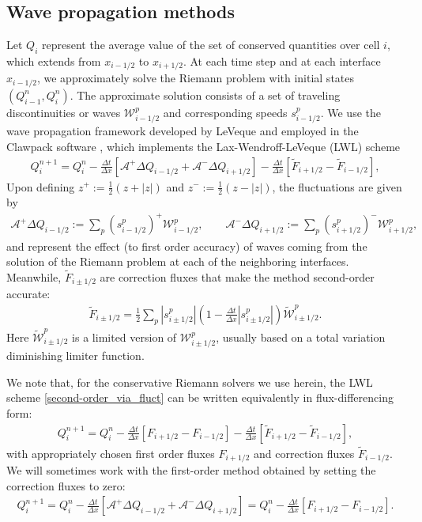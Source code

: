 \documentclass[preprint, 11pt]{article}
\newcommand{\W}{{\mathcal W}}
\newcommand{\A}{{\mathcal A}}
\newcommand{\apdq}{\A^+ \!\!{\Delta} Q}
\newcommand{\amdq}{\A^- \!\!{\Delta} Q}
\newcommand{\Ft}{\tilde{F}}
\newcommand{\imh}{{i-1/2}}
\newcommand{\iph}{{i+1/2}}
\newcommand{\bfF}{{F}}
\begin{document}
\subsection{Wave propagation methods}\label{sec:waveprop}
Let $Q_i$ represent the average value of the set of
conserved quantities over cell $i$, which extends from $x_\imh$ to $x_\iph$.
At each time step and at each interface $x_\imh$, we approximately solve the
Riemann problem with initial states $(Q^n_{i-1},Q^n_i)$.  The approximate
solution consists of a set of traveling discontinuities or waves $\W^p_\imh$
and corresponding speeds $s^p_\imh$.
We use the wave propagation framework developed by LeVeque \cite{leveque1997wave, leveque2002finite}
and employed in the Clawpack software \cite{clawpack,pyclaw-sisc}, which implements the 
Lax-Wendroff-LeVeque (LWL) scheme
\begin{align}\label{second-order_via_fluct}
  Q_i^{n+1} = Q_i^n-\frac{\Delta t}{\Delta x}\left[\apdq_\imh+\amdq_\iph\right]
  -\frac{\Delta t}{\Delta x}\left[\tilde{F}_{i+1/2}-\tilde{F}_{i-1/2}\right],
\end{align}
Upon defining $z^+:=\frac{1}{2}(z+|z|)$ and $z^-:=\frac{1}{2}(z-|z|)$,
the fluctuations are given by
\begin{align}\label{fluct}
  \apdq_\imh := \sum_p\left(s_{i-1/2}^p\right)^+\W_{i-1/2}^p, \qquad
  \amdq_\iph := \sum_p\left(s_{i+1/2}^p\right)^-\W_{i+1/2}^p, 
\end{align}
and represent the effect (to first
order accuracy) of waves coming from the solution of the Riemann problem at
each of the neighboring interfaces.  Meanwhile, $\Ft_{i\pm 1/2}$ are correction
fluxes that make the method second-order accurate:
\begin{align}\label{correction-fluxes}
  \tilde{F}_{i\pm 1/2}=\frac{1}{2}\sum_p|s_{i\pm 1/2}^p|\left(1-\frac{\Delta t}{\Delta x}|s_{i\pm 1/2}^p|\right)\tilde\W_{i\pm 1/2}^p.
\end{align}
Here $\tilde{\W}_{i\pm 1/2}^p$ is a limited version of $\W_{i\pm 1/2}^p$, usually
based on a total variation diminishing limiter function.

We note that, for the conservative Riemann solvers we use herein, the LWL scheme
\eqref{second-order_via_fluct} can be written equivalently in flux-differencing
form:
\begin{align}\label{flux-differencing-form}
  Q_i^{n+1}=Q_i^n-\frac{\Delta t}{\Delta x}\left[\bfF_{i+1/2}-\bfF_{i-1/2}\right]
 -\frac{\Delta t}{\Delta x}\left[\tilde{F}_{i+1/2}-\tilde{F}_{i-1/2}\right],
\end{align}
with appropriately chosen first order fluxes $\bfF_{i+1/2}$ and correction
fluxes $\tilde{F}_{i-1/2}$.
We will sometimes work with
the first-order method obtained by setting the correction fluxes to zero:
\begin{align}\label{first-order_via_fluct}
  Q_i^{n+1} = Q_i^n-\frac{\Delta t}{\Delta x}\left[\apdq_\imh+\amdq_\iph\right]
 = Q_i^n -\frac{\Delta t}{\Delta x}\left[\bfF_{i+1/2}-\bfF_{i-1/2}\right].
\end{align}
\end{document}
